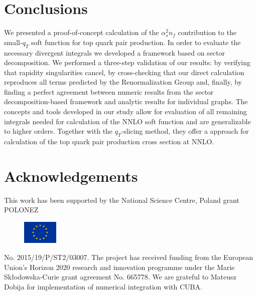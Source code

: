 \documentclass{PoS}
\begin{document}
\section{Conclusions}

We presented a proof-of-concept calculation of the $\alpha_s^2 n_f$
contribution to the small-$q_T$ soft function for top quark pair production. In
order to evaluate the necessary divergent integrals we developed a framework
based on sector decomposition. 
%
We performed a three-step validation of our results: by verifying that
rapidity singularities cancel, by cross-checking that our direct calculation
reproduces all terms predicted by the Renormalization Group and, finally, by
finding a perfect agreement between numeric results from the sector
decomposition-based framework and analytic results for individual graphs.
%
The concepts and tools developed in our study allow for evaluation of all
remaining integrals needed for calculation of the NNLO soft function and are
generalizable to higher orders. Together with the $q_T$-slicing method, they
offer  a approach for calculation of the top quark pair production cross
section at NNLO.

\section*{Acknowledgements}

This work has been supported by the National Science Centre, Poland grant
POLONEZ  
\begin{figure}
  \centering
  \vspace{-10pt}
  \includegraphics[width=0.15\textwidth]{plots/flag_yellow_low.jpg}
\end{figure}
%
No. 2015/19/P/ST2/03007. 
%
The project has received funding from the
European Union's Horizon 2020 research  and  innovation  programme  under  the
Marie Sk\l{}odowska-Curie grant agreement No. 665778.
%
We are grateful to Mateusz Dobija for implementation of numerical integration
with CUBA.  

\end{document}
